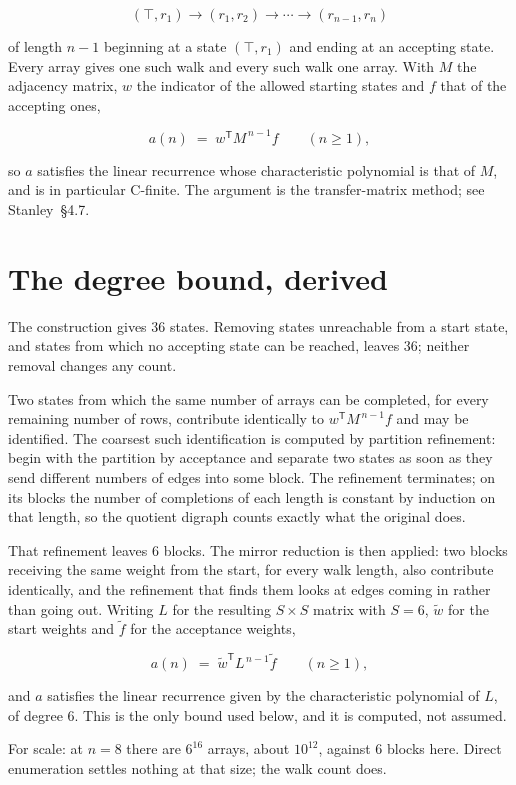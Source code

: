 \documentclass[11pt]{article}
\theoremstyle{definition}
\begin{document}
\[(\top,r_1) \to (r_1,r_2) \to \cdots \to (r_{n-1},r_n)\]

of length $n-1$ beginning at a state $(\top,r_1)$ and ending at an accepting state. Every array gives one such walk and every such walk one array. With $M$ the adjacency matrix, $w$ the indicator of the allowed starting states and $f$ that of the accepting ones,

\[a(n) \;=\; w^{\mathsf T} M^{\,n-1} f \qquad (n \ge 1),\]

so $a$ satisfies the linear recurrence whose characteristic polynomial is that of $M$, and is in particular C-finite. The argument is the transfer-matrix method; see Stanley~\S4.7.

\section{The degree bound, derived}

The construction gives $36$ states. Removing states unreachable from a start state, and states from which no accepting state can be reached, leaves $36$; neither removal changes any count.

Two states from which the same number of arrays can be completed, for every remaining number of rows, contribute identically to $w^{\mathsf T}M^{\,n-1}f$ and may be identified. The coarsest such identification is computed by partition refinement: begin with the partition by acceptance and separate two states as soon as they send different numbers of edges into some block. The refinement terminates; on its blocks the number of completions of each length is constant by induction on that length, so the quotient digraph counts exactly what the original does.

That refinement leaves $6$ blocks. The mirror reduction is then applied: two blocks receiving the same weight from the start, for every walk length, also contribute identically, and the refinement that finds them looks at edges coming in rather than going out. Writing $L$ for the resulting $S \times S$ matrix with $S = 6$, $\tilde w$ for the start weights and $\tilde f$ for the acceptance weights,

\[a(n) \;=\; \tilde w^{\mathsf T} L^{\,n-1} \tilde f \qquad (n \ge 1),\]

and $a$ satisfies the linear recurrence given by the characteristic polynomial of $L$, of degree $6$. This is the only bound used below, and it is computed, not assumed.

For scale: at $n = 8$ there are $6^{16}$ arrays, about $10^{12}$, against $6$ blocks here. Direct enumeration settles nothing at that size; the walk count does.
\end{document}
